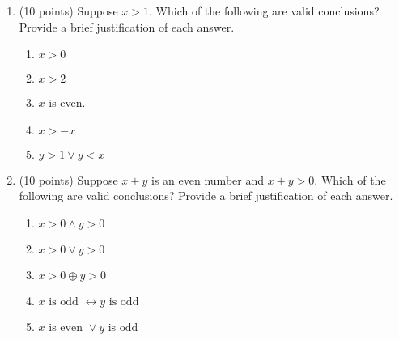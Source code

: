 \documentclass[12pt,fleqn]{article}
\begin{document}
\begin{enumerate}
\item (10 points) Suppose $x > 1$. Which of the following are valid
  conclusions?  Provide a brief justification of each answer.

\begin{enumerate}
\item $x > 0$
\item $x > 2$
\item $x$ is even.
\item $x > -x$
\item $y > 1 \vee y < x$
\end{enumerate}


\item (10 points) Suppose $x + y$ is an even number and $x + y > 0$.
  Which of the following are valid conclusions?  Provide a brief
  justification of each answer.

\begin{enumerate}
\item $x > 0 \wedge y > 0$
\item $x > 0 \vee y > 0$
\item $x > 0 \oplus y > 0$
\item $x \mbox{\ is odd\ } \leftrightarrow y \mbox{\ is odd}$
\item $x \mbox{\ is even\ } \vee y \mbox{\ is odd}$
\end{enumerate}

\end{enumerate}
\end{document}
